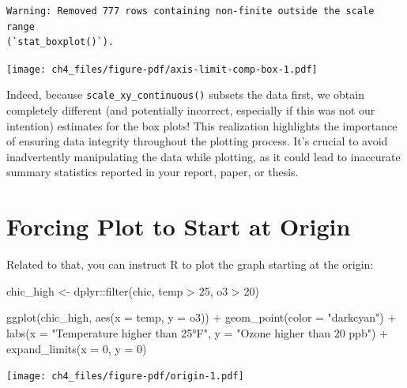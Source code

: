 \documentclass[
  letterpaper,
]{scrbook}
\newenvironment{Shaded}{\begin{snugshade}}{\end{snugshade}}
\newcommand{\AttributeTok}[1]{\textcolor[rgb]{0.40,0.45,0.13}{#1}}
\newcommand{\DecValTok}[1]{\textcolor[rgb]{0.68,0.00,0.00}{#1}}
\newcommand{\FunctionTok}[1]{\textcolor[rgb]{0.28,0.35,0.67}{#1}}
\newcommand{\NormalTok}[1]{\textcolor[rgb]{0.00,0.23,0.31}{#1}}
\newcommand{\OtherTok}[1]{\textcolor[rgb]{0.00,0.23,0.31}{#1}}
\newcommand{\SpecialCharTok}[1]{\textcolor[rgb]{0.37,0.37,0.37}{#1}}
\newcommand{\StringTok}[1]{\textcolor[rgb]{0.13,0.47,0.30}{#1}}
\begin{document}
\begin{verbatim}
Warning: Removed 777 rows containing non-finite outside the scale range
(`stat_boxplot()`).
\end{verbatim}

\texttt{[image: ch4\_files/figure-pdf/axis-limit-comp-box-1.pdf]}

Indeed, because \texttt{scale\_x\textbar{}y\_continuous()} subsets the
data first, we obtain completely different (and potentially incorrect,
especially if this was not our intention) estimates for the box plots!
This realization highlights the importance of ensuring data integrity
throughout the plotting process. It's crucial to avoid inadvertently
manipulating the data while plotting, as it could lead to inaccurate
summary statistics reported in your report, paper, or thesis.

\section{Forcing Plot to Start at
Origin}\label{forcing-plot-to-start-at-origin}

Related to that, you can instruct R to plot the graph starting at the
origin:

\begin{Shaded}
\begin{Highlighting}[]
\NormalTok{chic\_high }\OtherTok{\textless{}{-}}\NormalTok{ dplyr}\SpecialCharTok{::}\FunctionTok{filter}\NormalTok{(chic, temp }\SpecialCharTok{\textgreater{}} \DecValTok{25}\NormalTok{, o3 }\SpecialCharTok{\textgreater{}} \DecValTok{20}\NormalTok{)}

\FunctionTok{ggplot}\NormalTok{(chic\_high, }\FunctionTok{aes}\NormalTok{(}\AttributeTok{x =}\NormalTok{ temp, }\AttributeTok{y =}\NormalTok{ o3)) }\SpecialCharTok{+}
  \FunctionTok{geom\_point}\NormalTok{(}\AttributeTok{color =} \StringTok{"darkcyan"}\NormalTok{) }\SpecialCharTok{+}
  \FunctionTok{labs}\NormalTok{(}\AttributeTok{x =} \StringTok{"Temperature higher than 25°F"}\NormalTok{,}
       \AttributeTok{y =} \StringTok{"Ozone higher than 20 ppb"}\NormalTok{) }\SpecialCharTok{+}
  \FunctionTok{expand\_limits}\NormalTok{(}\AttributeTok{x =} \DecValTok{0}\NormalTok{, }\AttributeTok{y =} \DecValTok{0}\NormalTok{)}
\end{Highlighting}
\end{Shaded}

\texttt{[image: ch4\_files/figure-pdf/origin-1.pdf]}
\end{document}
